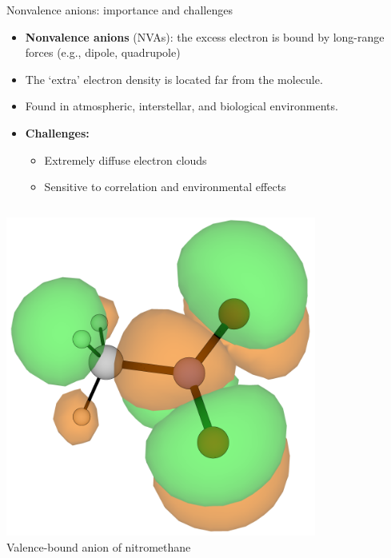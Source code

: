 \documentclass[9pt,t,xcolor=table]{beamer}
\begin{document}
\begin{frame}{\huge Nonvalence anions: importance and challenges}\large
    \vspace{5pt}
    \begin{itemize}
        \item \textbf{Nonvalence anions} (NVAs): the excess electron is bound by long-range forces (e.g., dipole, quadrupole)
        \item The `extra' electron density is located far from the molecule.
        \item Found in atmospheric, interstellar, and biological environments.
        \item \textbf{Challenges:}
        \begin{itemize}
            \item Extremely diffuse electron clouds
            \item Sensitive to correlation and environmental effects
        \end{itemize}
    \end{itemize}
    \vspace{5pt}
	\begin{columns}
		\begin{column}{0.27\textwidth}
			\centering
			\includegraphics[width=0.8\textwidth]{Figs/MeNO2_VBS.png}\\
			\vspace{3pt}
			\small Valence-bound anion of nitromethane
		\end{column}
		\begin{column}{0.3\textwidth}

\end{column}
\end{columns}
\end{frame}
\end{document}

